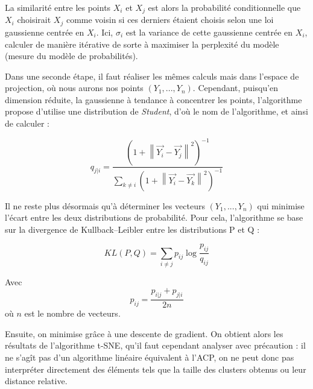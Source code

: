 \documentclass[11pt,french,french]{article}
\begin{document}
La similarité entre les points \(X_i\) et \(X_j\) est alors la
probabilité conditionnelle que \(X_i\) choisirait \(X_j\) comme voisin
si ces derniers étaient choisis selon une loi gaussienne centrée en
\(X_i\). Ici, \(\sigma_i\) est la variance de cette gaussienne centrée
en \(X_i\), calculer de manière itérative de sorte à maximiser la
perplexité du modèle (mesure du modèle de probabilités).

Dans une seconde étape, il faut réaliser les mêmes calculs mais dans
l'espace de projection, où nous aurons nos points \((Y_1,..., Y_n)\).
Cependant, puisqu'en dimension réduite, la gaussienne à tendance à
concentrer les points, l'algorithme propose d'utilise une distribution
de \emph{Student}, d'où le nom de l'algorithme, et ainsi de calculer :

\[ q_{j|i} = \frac{(1+\left\| \vec{Y_i} - \vec{Y_j}  \right\|^2)^{-1}}{\sum_{k \neq i}{(1+\left\| \vec{Y_i} - \vec{Y_k}  \right\|^2)^{-1}}}\]

Il ne reste plus désormais qu'à déterminer les vecteurs
\((Y_1,...,Y_n)\) qui minimise l'écart entre les deux distributions de
probabilité. Pour cela, l'algorithme se base sur la divergence de
Kullback--Leibler entre les distributions P et Q :

\[KL(P,Q) = \sum_{i \neq j} { p_{ij} \log{\frac{p_{ij}}{q_{ij}}}}\]

Avec \[p_{ij} = \frac{p_{i|j} + p_{j|i}}{2n}\] où \(n\) est le nombre de
vecteurs.

Ensuite, on minimise grâce à une descente de gradient. On obtient alors
les résultats de l'algorithme t-SNE, qu'il faut cependant analyser avec
précaution : il ne s'agît pas d'un algorithme linéaire équivalent à
l'ACP, on ne peut donc pas interpréter directement des éléments tels que
la taille des clusters obtenus ou leur distance relative.
\end{document}
